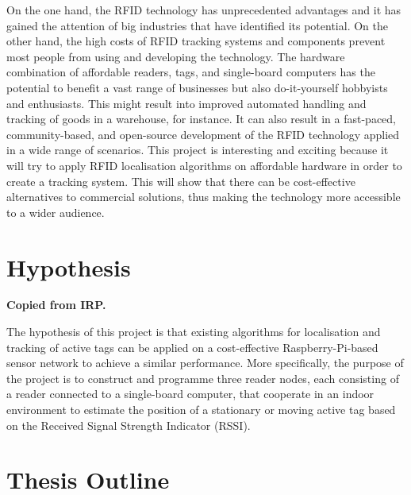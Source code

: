 On the one hand, the RFID technology has unprecedented advantages and it has gained the attention of big industries that have identified its potential. On the other hand, the high costs of RFID tracking systems and components prevent most people from using and developing the technology. The hardware combination of affordable readers, tags, and single-board computers has the potential to benefit a vast range of businesses but also do-it-yourself hobbyists and enthusiasts. This might result into improved automated handling and tracking of goods in a warehouse, for instance. It can also result in a fast-paced, community-based, and open-source development of the RFID technology applied in a wide range of scenarios. This  project is interesting and exciting because it will try to apply RFID localisation algorithms on affordable hardware in order to create a tracking system. This will show that there can be cost-effective alternatives to commercial solutions, thus making the technology more accessible to a wider audience.

\section{Hypothesis}

\textbf{Copied from IRP.}

The hypothesis of this project is that existing algorithms for localisation and tracking of active tags can be applied on a cost-effective Raspberry-Pi-based sensor network to achieve a similar performance. More specifically, the purpose of the project is to construct and programme three reader nodes, each consisting of a reader connected to a single-board computer, that cooperate in an indoor environment to estimate the position of a stationary or moving active tag based on the Received Signal Strength Indicator (RSSI).

\section{Thesis Outline}


